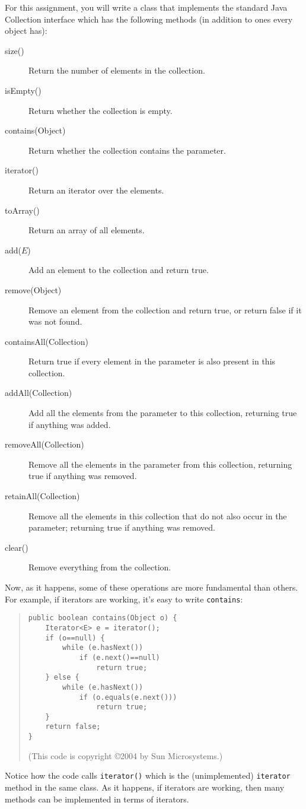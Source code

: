 \documentclass[11pt]{article}
\begin{document}
For this assignment, you will write a class that implements
the standard Java Collection interface which has the following
methods (in addition to ones every object has):
\begin{description}
    \item[size()] Return the number of elements in the collection.
    \item[isEmpty()] Return whether the collection is empty.
    \item[contains(Object)] Return whether the collection contains the parameter.
    \item[iterator()] Return an iterator over the elements.
    \item[toArray()] Return an array of all elements.
    \item[add($E$)] Add an element to the collection and return true.
    \item[remove(Object)] Remove an element from the collection and
      return true, or return false if it was not found.
    \item[containsAll(Collection)] Return true if every element in the
      parameter is also present in this collection.
    \item[addAll(Collection)] Add all the elements from the parameter
      to this collection, returning true if anything was added.
    \item[removeAll(Collection)] Remove all the elements in the parameter
      from this collection, returning true if anything was removed.
    \item[retainAll(Collection)] Remove all the elements in this
      collection that do not also occur in the parameter; returning
      true if anything was removed.
    \item[clear()] Remove everything from the collection.
\end{description}
\pagebreak
Now, as it happens, some of these operations are more fundamental than
others.  For example, if iterators are working, it's easy to write
\verb|contains|:
\begin{quote}
\begin{verbatim}
public boolean contains(Object o) {
    Iterator<E> e = iterator();
    if (o==null) {
        while (e.hasNext())
            if (e.next()==null)
                return true;
    } else {
        while (e.hasNext())
            if (o.equals(e.next()))
                return true;
    }
    return false;
}
\end{verbatim}
(This code is copyright \copyright 2004 by Sun Microsystems.)
\end{quote}
Notice how the code calls \verb|iterator()| which is the
(unimplemented) \verb|iterator| method in the same class.
As it happens, if iterators are working, then many methods can be
implemented in terms of iterators.
\end{document}
